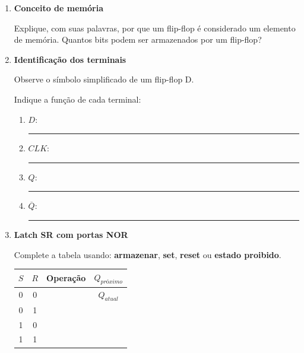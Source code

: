 \documentclass[a4paper,12pt]{article}
\begin{document}
\begin{enumerate}[leftmargin=0.8cm,label=\textbf{\arabic*.},itemsep=0.65cm]

\item \textbf{Conceito de memória}

Explique, com suas palavras, por que um flip-flop é considerado um elemento de
memória. Quantos bits podem ser armazenados por um flip-flop?

\vspace{1.3cm}

\item \textbf{Identificação dos terminais}

Observe o símbolo simplificado de um flip-flop D.

\begin{center}
\end{center}

Indique a função de cada terminal:

\begin{enumerate}[label=\alph*)]
    \item $D$: \rule{0.72\textwidth}{0.4pt}
    \item $CLK$: \rule{0.68\textwidth}{0.4pt}
    \item $Q$: \rule{0.72\textwidth}{0.4pt}
    \item $\overline{Q}$: \rule{0.67\textwidth}{0.4pt}
\end{enumerate}

\item \textbf{Latch SR com portas NOR}

Complete a tabela usando: \textbf{armazenar}, \textbf{set}, \textbf{reset} ou
\textbf{estado proibido}.

\begin{center}
\renewcommand{\arraystretch}{1.5}
\begin{tabular}{|c|c|c|c|}
\hline
$S$ & $R$ & \textbf{Operação} & $Q_{próximo}$ \\
\hline
0 & 0 & & $Q_{atual}$ \\
\hline
0 & 1 & & \\
\hline
1 & 0 & & \\
\hline
1 & 1 & & \\
\hline
\end{tabular}
\end{center}


\end{enumerate}
\end{document}
